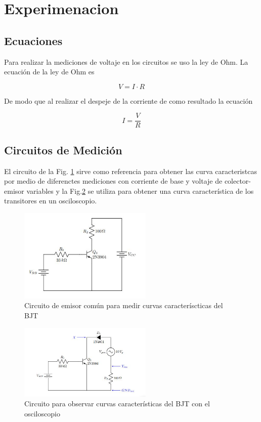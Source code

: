 \documentclass[journal]{IEEEtran}
\begin{document}
\section{Experimenacion}
\subsection{Ecuaciones}
Para realizar la mediciones de voltaje en los circuitos se uso la ley de Ohm. La ecuación de la ley de Ohm es
\par
\begin{equation}
V=I\cdot R
\end{equation}


De modo que al realizar el despeje de la corriente de como resultado la ecuación

\begin{equation}
I=\frac{V}{R}
\end{equation}

\subsection{Circuitos de Medición}

El circuito de la Fig. \ref{fig:T1} sirve como referencia para obtener las curva caracteristcas por medio de diferenctes mediciones con corriente de base y voltaje de colector-emisor variables y la Fig.\ref{fig:T2} se utiliza para obtener una curva característica de los transitores en un osciloscopio.

 
\begin{figure}[H]
	\centering
	\includegraphics[width=2.5in]{circuito_T1}
	\caption{Circuito de emisor común para medir curvas caracteríscticas del BJT}
	\label{fig:T1}	
\end{figure}
\hfill

\begin{figure}[H]
	\centering
	\includegraphics[width=2.5in]{circuito_T2}
	\caption{Circuito para observar curvas características del BJT con el osciloscopio}
	\label{fig:T2}	
\end{figure}
\hfill
\end{document}
